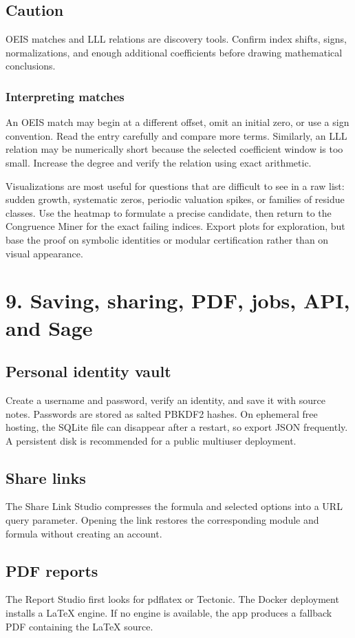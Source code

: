 \documentclass[11pt]{article}
\begin{document}
\subsection*{Caution}
OEIS matches and LLL relations are discovery tools. Confirm index shifts, signs, normalizations, and enough additional coefficients before drawing mathematical conclusions.

\subsubsection*{Interpreting matches}
An OEIS match may begin at a different offset, omit an initial zero, or use a sign convention. Read the entry carefully and compare more terms. Similarly, an LLL relation may be numerically short because the selected coefficient window is too small. Increase the degree and verify the relation using exact arithmetic.

Visualizations are most useful for questions that are difficult to see in a raw list: sudden growth, systematic zeros, periodic valuation spikes, or families of residue classes. Use the heatmap to formulate a precise candidate, then return to the Congruence Miner for the exact failing indices. Export plots for exploration, but base the proof on symbolic identities or modular certification rather than on visual appearance.

\newpage
\section{9. Saving, sharing, PDF, jobs, API, and Sage}
\subsection*{Personal identity vault}
Create a username and password, verify an identity, and save it with source notes. Passwords are stored as salted PBKDF2 hashes. On ephemeral free hosting, the SQLite file can disappear after a restart, so export JSON frequently. A persistent disk is recommended for a public multiuser deployment.

\subsection*{Share links}
The Share Link Studio compresses the formula and selected options into a URL query parameter. Opening the link restores the corresponding module and formula without creating an account.

\subsection*{PDF reports}
The Report Studio first looks for pdflatex or Tectonic. The Docker deployment installs a LaTeX engine. If no engine is available, the app produces a fallback PDF containing the LaTeX source.
\end{document}
